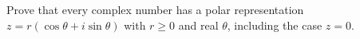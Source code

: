 Prove that every complex number has a polar representation $z=r(\cos\theta+i\sin\theta)$ with $r\ge0$ and real $\theta$, including the case $z=0$.
